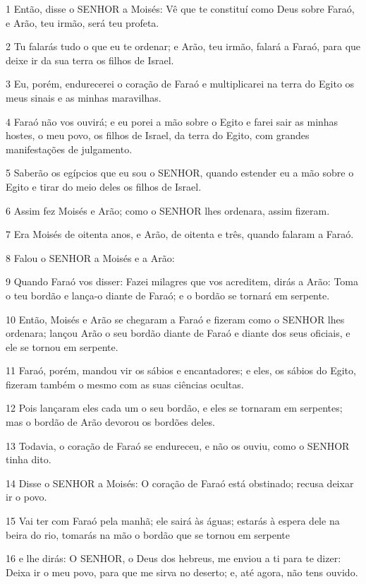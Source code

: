\par 1 Então, disse o SENHOR a Moisés: Vê que te constituí como Deus sobre Faraó, e Arão, teu irmão, será teu profeta.
\par 2 Tu falarás tudo o que eu te ordenar; e Arão, teu irmão, falará a Faraó, para que deixe ir da sua terra os filhos de Israel.
\par 3 Eu, porém, endurecerei o coração de Faraó e multiplicarei na terra do Egito os meus sinais e as minhas maravilhas.
\par 4 Faraó não vos ouvirá; e eu porei a mão sobre o Egito e farei sair as minhas hostes, o meu povo, os filhos de Israel, da terra do Egito, com grandes manifestações de julgamento.
\par 5 Saberão os egípcios que eu sou o SENHOR, quando estender eu a mão sobre o Egito e tirar do meio deles os filhos de Israel.
\par 6 Assim fez Moisés e Arão; como o SENHOR lhes ordenara, assim fizeram.
\par 7 Era Moisés de oitenta anos, e Arão, de oitenta e três, quando falaram a Faraó.
\par 8 Falou o SENHOR a Moisés e a Arão:
\par 9 Quando Faraó vos disser: Fazei milagres que vos acreditem, dirás a Arão: Toma o teu bordão e lança-o diante de Faraó; e o bordão se tornará em serpente.
\par 10 Então, Moisés e Arão se chegaram a Faraó e fizeram como o SENHOR lhes ordenara; lançou Arão o seu bordão diante de Faraó e diante dos seus oficiais, e ele se tornou em serpente.
\par 11 Faraó, porém, mandou vir os sábios e encantadores; e eles, os sábios do Egito, fizeram também o mesmo com as suas ciências ocultas.
\par 12 Pois lançaram eles cada um o seu bordão, e eles se tornaram em serpentes; mas o bordão de Arão devorou os bordões deles.
\par 13 Todavia, o coração de Faraó se endureceu, e não os ouviu, como o SENHOR tinha dito.
\par 14 Disse o SENHOR a Moisés: O coração de Faraó está obstinado; recusa deixar ir o povo.
\par 15 Vai ter com Faraó pela manhã; ele sairá às águas; estarás à espera dele na beira do rio, tomarás na mão o bordão que se tornou em serpente
\par 16 e lhe dirás: O SENHOR, o Deus dos hebreus, me enviou a ti para te dizer: Deixa ir o meu povo, para que me sirva no deserto; e, até agora, não tens ouvido.
